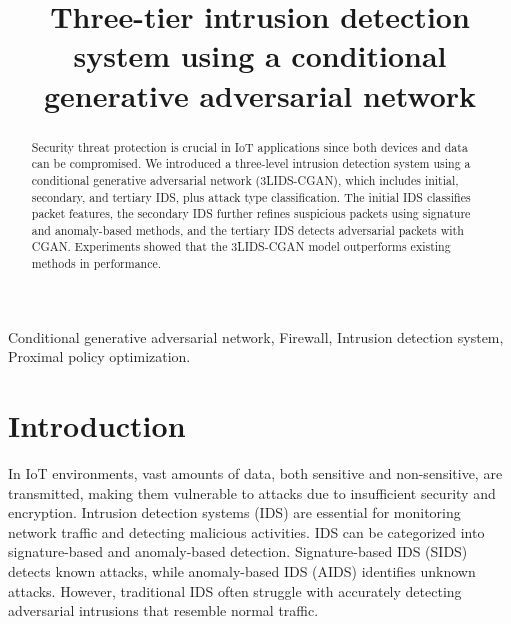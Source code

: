 \documentclass[conference]{IEEEtran}
\begin{document}
\title{Three-tier intrusion detection system using a conditional generative adversarial network}

\author{
}

\maketitle

\begin{abstract}
Security threat protection is crucial in IoT applications since both devices and data can be compromised. We introduced a three-level intrusion detection system using a conditional generative adversarial network (3LIDS-CGAN), which includes initial, secondary, and tertiary IDS, plus attack type classification. The initial IDS classifies packet features, the secondary IDS further refines suspicious packets using signature and anomaly-based methods, and the tertiary IDS detects adversarial packets with CGAN. Experiments showed that the 3LIDS-CGAN model outperforms existing methods in performance.
\end{abstract}

\begin{IEEEkeywords}
Conditional generative adversarial network, Firewall, Intrusion detection system, Proximal policy optimization.
\end{IEEEkeywords}

\section{Introduction}
In IoT environments, vast amounts of data, both sensitive and non-sensitive, are transmitted, making them vulnerable to attacks due to insufficient security and encryption. Intrusion detection systems (IDS) are essential for monitoring network traffic and detecting malicious activities. IDS can be categorized into signature-based and anomaly-based detection. Signature-based IDS (SIDS) detects known attacks, while anomaly-based IDS (AIDS) identifies unknown attacks. However, traditional IDS often struggle with accurately detecting adversarial intrusions that resemble normal traffic.
\end{document}
